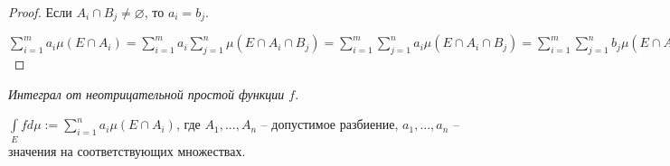 \begin{proof}
    Если $A_i\cap B_j\not=\varnothing$, то $a_i=b_j$.

    $\sum\limits_{i=1}^m a_i \mu (E\cap A_i)=\sum\limits_{i=1}^m a_i \sum\limits_{j=1}^n \mu (E\cap A_i\cap B_j)=
    \sum\limits_{i=1}^m \sum\limits_{j=1}^n a_i \mu(E\cap A_i\cap B_j)=\sum\limits_{i=1}^m \sum\limits_{j=1}^n b_j \mu(E\cap A_i\cap B_j)=
    \sum\limits_{j=1}^n b_j \mu (E\cap B_j)$
\end{proof}

\begin{definition}
    \textit{Интеграл от неотрицательной простой функции $f$}.
    
    $\int\limits_E f d\mu := 
    \sum\limits_{i=1}^n a_i \mu (E\cap A_i)$, где $A_1, ..., A_n$ – допустимое разбиение,
    $a_1, ..., a_n$ – значения на соответствующих множествах.
\end{definition}